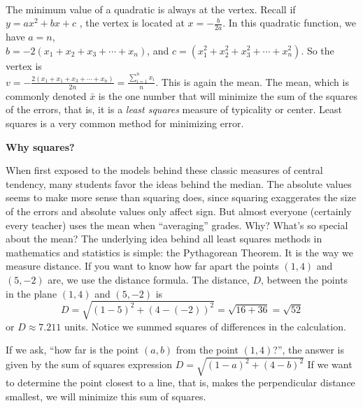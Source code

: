 \documentclass[10pt,]{book}
\theoremstyle{ptxdefinitionnotitle}
\theoremstyle{ptxdefinitiontitle}
\numberwithin{equation}{section}
\begin{document}
\begin{example}[{.}]
\begin{align*}
\end{align*}
The minimum value of a quadratic is always at the vertex. Recall if \(y = ax^2 +bx +c\) , the vertex is located at \(x = - \frac{b}{2a}\). In this quadratic function, we have \(a = n\), \\ \(b = - 2\left( {{x_1} + {x_2} + {x_3} +  \cdots  + {x_n}} \right)\), and \(c = \left( {x_1^2 + x_2^2 + x_3^2 +  \cdots  + x_n^2} \right)\). So the vertex is \\ \(v = - \frac{{2\left( {{x_1} + {x_1} + {x_3} +  \cdots  + {x_n}} \right)}}{{2n}} = \frac{{\sum\limits_{i = 1}^n {{x_i}} }}{n}\). This is again the mean. The mean, which is commonly denoted \(\bar x\) is the one number that will minimize the sum of the squares of the errors, that is, it is a \emph{least squares} measure of typicality or center. Least squares is a very common method for minimizing error. \\%
\par
\hypertarget{p-70}{}%
\noindent \textbf{Why squares?}%
\par
\hypertarget{p-71}{}%
When first exposed to the models behind these classic measures of central tendency, many students favor the ideas behind the median. The absolute values seems to make more sense than squaring does, since squaring exaggerates the size of the errors and absolute values only affect sign. But almost everyone (certainly every teacher) uses the mean when “averaging” grades. Why? What’s so special about the mean? The underlying idea behind all least squares methods in mathematics and statistics is simple: the Pythagorean Theorem. It is the way we measure distance. If you want to know how far apart the points \(\left( {1,4} \right)\) and \(\left( {5, - 2} \right)\) are, we use the distance formula. The distance, \(D\), between the points in the plane \(\left( {1,4} \right)\) and \(\left( {5, - 2} \right)\) is%
\begin{equation*}
D = \sqrt {{{\left( {1 - 5} \right)}^2} + {{\left( {4 - \left( { - 2} \right)} \right)}^2}}  = \sqrt {16 + 36}  = \sqrt {52}
\end{equation*}
or \(D \approx 7.211\) units. Notice we summed squares of differences in the calculation. \\%
\par
\hypertarget{p-72}{}%
If we ask, ``how far is the point \(\left ( a, b \right)\) from the point \(\left (1 , 4 \right)\)?'', the answer is given by the sum of squares expression \(D = \sqrt {{{\left( {1 - a} \right)}^2} + {{\left( {4 - b} \right)}^2}}\) If we want to determine the point closest to a line, that is, makes the perpendicular distance smallest, we will minimize this sum of squares.%

\end{example}
\end{document}
